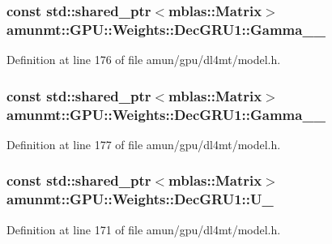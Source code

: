 \subsubsection[{\texorpdfstring{Gamma\+\_\+1\+\_\+}{Gamma_1_}}]{\setlength{\rightskip}{0pt plus 5cm}const std\+::shared\+\_\+ptr$<${\bf mblas\+::\+Matrix}$>$ amunmt\+::\+G\+P\+U\+::\+Weights\+::\+Dec\+G\+R\+U1\+::\+Gamma\+\_\+\_\+}\hypertarget{structamunmt_1_1GPU_1_1Weights_1_1DecGRU1_a24e4da5905976eb0a31447e8d10f33aa}{}\label{structamunmt_1_1GPU_1_1Weights_1_1DecGRU1_a24e4da5905976eb0a31447e8d10f33aa}


Definition at line 176 of file amun/gpu/dl4mt/model.\+h.

\subsubsection[{\texorpdfstring{Gamma\+\_\+2\+\_\+}{Gamma_2_}}]{\setlength{\rightskip}{0pt plus 5cm}const std\+::shared\+\_\+ptr$<${\bf mblas\+::\+Matrix}$>$ amunmt\+::\+G\+P\+U\+::\+Weights\+::\+Dec\+G\+R\+U1\+::\+Gamma\+\_\+\_\+}\hypertarget{structamunmt_1_1GPU_1_1Weights_1_1DecGRU1_a84a8af34ee606c8741d952545c296e5f}{}\label{structamunmt_1_1GPU_1_1Weights_1_1DecGRU1_a84a8af34ee606c8741d952545c296e5f}


Definition at line 177 of file amun/gpu/dl4mt/model.\+h.

\subsubsection[{\texorpdfstring{U\+\_\+}{U_}}]{\setlength{\rightskip}{0pt plus 5cm}const std\+::shared\+\_\+ptr$<${\bf mblas\+::\+Matrix}$>$ amunmt\+::\+G\+P\+U\+::\+Weights\+::\+Dec\+G\+R\+U1\+::\+U\+\_\+}\hypertarget{structamunmt_1_1GPU_1_1Weights_1_1DecGRU1_ae47a584603b8ead1ea81ec0e19229558}{}\label{structamunmt_1_1GPU_1_1Weights_1_1DecGRU1_ae47a584603b8ead1ea81ec0e19229558}


Definition at line 171 of file amun/gpu/dl4mt/model.\+h.

